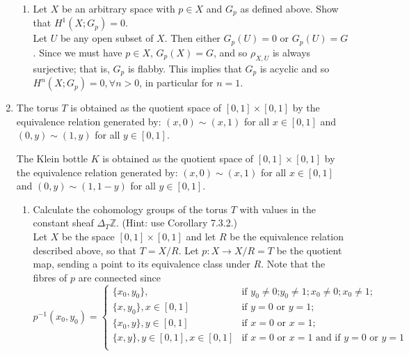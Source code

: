 \documentclass{article}
\newcommand{\zed}{\mathbb Z}
\begin{document}
\begin{enumerate}
\begin{enumerate}
\item Let $X$ be an arbitrary space with $p\in X$ and $G_p$ as defined above.
Show that $H^1(X;G_p)=0$.\\

Let $U$ be any open subset of $X$. Then either $G_p(U)=0$ or $G_p(U)=G$. Since we must have $p \in X$, $G_p(X)=G$, and so $\rho_{X,U}$ is always surjective; that is, $G_p$ is flabby.  This implies that $G_p$ is acyclic and so $H^n(X;G_p)=0, \forall n >0$, in particular for $n=1$.
\end{enumerate}
\newpage
\item
The torus $T$ is obtained as the quotient space of $[0,1]\times[0,1]$ by the equivalence relation generated by: 
$(x,0)\sim (x,1)$ for all $x\in [0,1]$ and $(0,y)\sim(1,y)$ for all $y\in [0,1]$.

The Klein bottle $K$ is obtained as the quotient space of $[0,1]\times[0,1]$ by the equivalence relation generated by: 
$(x,0)\sim (x,1)$ for all $x\in [0,1]$ and $(0,y)\sim(1,1-y)$ for all $y\in [0,1]$.
\begin{enumerate}
\item
Calculate the cohomology groups of the torus $T$ with values in the constant sheaf $\Delta_T\zed$. (Hint: use Corollary 7.3.2.)\\


Let $X$ be the space $[0,1]\times [0,1]$ and let $R$ be the equivalence relation described above, so that $T = X/R$. Let $p: X \rightarrow X/R=T$ be the quotient map, sending a point to its equivalence class under $R$. Note that the fibres of $p$ are connected since 
\[p^{-1}(x_0,y_0)= 
\begin{cases}
\{x_0,y_0\}, & \text{if } y_0 \neq 0 \text{;} y_0 \neq 1; x_0 \neq 0; x_0 \neq 1;\\
\{x,y_0\}, x \in [0,1] & \text{if } y = 0 \text{ or } y = 1;\\
\{x_0,y\}, y \in [0,1] & \text{if } x = 0 \text{ or } x = 1;\\
\{x,y\}, y \in [0,1], x \in [0,1] & \text{if } x = 0 \text{ or } x = 1 \text{ and } \text{if } y = 0 \text{ or } y = 1\\
\end{cases}\] \\



\end{enumerate}
\end{enumerate}
\end{document}
